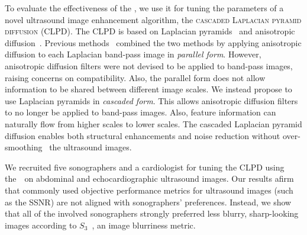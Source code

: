 
To evaluate the effectiveness of the \usdg, we use it for tuning the parameters of a novel ultrasound image enhancement algorithm, the \textsc{cascaded Laplacian pyramid diffusion} (CLPD).
The CLPD is based on Laplacian pyramids~\cite{burt_laplacian_1983} and anisotropic diffusion~\cite{perona_scalespace_1990, weickert_anisotropic_1998}.
Previous methods~\cite{zhang_multiscale_2006, zhang_nonlinear_2007, kang_new_2016} combined the two methods by applying anisotropic diffusion to each Laplacian band-pass image in \textit{parallel form}.
However, anisotropic diffusion filters were not devised to be applied to band-pass images, raising concerns on compatibility.
Also, the parallel form does not allow information to be shared between different image scales.
We instead propose to use Laplacian pyramids in \textit{cascaded form}.
This allows anisotropic diffusion filters to no longer be applied to band-pass images.
Also, feature information can naturally flow from higher scales to lower scales.
The cascaded Laplacian pyramid diffusion enables both structural enhancements and noise reduction without over-smoothing~\cite{ramos-llorden_anisotropic_2015, mishra_edge_2018} the ultrasound images.

We recruited five sonographers and a cardiologist for tuning the CLPD using the~\usdg~on abdominal and echocardiographic ultrasound images.
Our results afirm that commonly used objective performance metrics for ultrasound images (such as the SSNR) are not aligned with sonographers' preferences.
Instead, we show that all of the involved sonographers strongly preferred less blurry, sharp-looking images according to \(S_3\)~\cite{vu_bf_2012}, an image blurriness metric.

